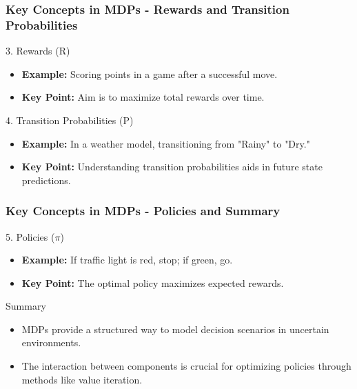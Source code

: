 \documentclass[aspectratio=169]{beamer}
\begin{document}
\begin{frame}[fragile]
    \frametitle{Key Concepts in MDPs - Rewards and Transition Probabilities}
    \begin{block}{3. Rewards (R)}
        \begin{itemize}
            \item \textbf{Example:} Scoring points in a game after a successful move.
            \item \textbf{Key Point:} Aim is to maximize total rewards over time.
        \end{itemize}
    \end{block}

    \begin{block}{4. Transition Probabilities (P)}
        \begin{itemize}
            \item \textbf{Example:} In a weather model, transitioning from "Rainy" to "Dry."
            \item \textbf{Key Point:} Understanding transition probabilities aids in future state predictions.
        \end{itemize}
    \end{block}
\end{frame}

\begin{frame}[fragile]
    \frametitle{Key Concepts in MDPs - Policies and Summary}
    \begin{block}{5. Policies ($\pi$)}
        \begin{itemize}
            \item \textbf{Example:} If traffic light is red, stop; if green, go.
            \item \textbf{Key Point:} The optimal policy maximizes expected rewards.
        \end{itemize}
    \end{block}

    \begin{block}{Summary}
        \begin{itemize}
            \item MDPs provide a structured way to model decision scenarios in uncertain environments.
            \item The interaction between components is crucial for optimizing policies through methods like value iteration.
        \end{itemize}
    \end{block}
\end{frame}
\end{document}
